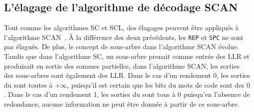 
\subsection{L'élagage de l'algorithme de décodage SCAN}
Tout comme les algorithmes SC et SCL, des élagages peuvent être appliqués à l'algorithme SCAN~\cite{lin_reduced_2015}. \`A la différence des deux précédents, les \noeuds \texttt{REP} et \texttt{SPC} ne sont pas élagués. De plus, le concept de sous-arbre dans l'algorithme SCAN évolue. Tandis que dans l'algorithme SC, un sous-arbre prenait comme entrée des LLR et produisait en sortie des sommes partielles, dans l'algorithme SCAN, les sorties des sous-arbres sont également des LLR. Dans le cas d'un rendement 0, les sorties du \noeud sont toutes à $+\infty$, puisqu'il est certain que les bits du mots de code sont des $0$. Dans le cas d'un rendement 1, les sorties du \noeud sont tous à $0$ puisqu'en l'absence de redondance, aucune information ne peut être donnée à partir de ce sous-arbre.



